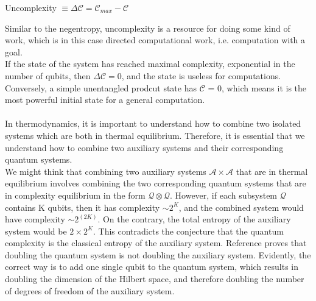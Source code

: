 \begin{center}
Uncomplexity $ \equiv \Delta \mathcal{C} = \mathcal{C}_{max} - \mathcal{C} $
\end{center}

Similar to the negentropy, uncomplexity is a resource for doing some kind of work, which is in this case directed computational work, i.e. computation with a goal.
\\
If the state of the system has reached maximal complexity, exponential in the number of qubits, then $ \Delta \mathcal{C} = 0 $, and the state is useless for computations. Conversely, a simple unentangled prodcut state has $\mathcal{C}$ = 0, which means it is the most powerful initial state for a general computation.
\\
\\
In thermodynamics, it is important to understand how to combine two isolated systems which are both in thermal equilibrium. Therefore, it is essential that we understand how to combine two auxiliary systems and their corresponding quantum systems.
\\
We might think that combining two auxiliary systems $\mathcal{A} \times \mathcal{A} $ that are in thermal equilibrium involves combining the two corresponding quantum systems that are in complexity equilibrium in the form $ \mathcal{Q} \otimes \mathcal{Q}$. However, if each subsystem $\mathcal{Q}$ contains K qubits, then it has complexity $ \sim 2^K $, and the combined system would have complexity $ \sim 2^{(2K)} $. On the contrary, the total entropy of the auxiliary system would be $ 2 \times 2^K $. This contradicts the conjecture that the quantum complexity is the classical entropy of the auxiliary system. Reference \cite{brown2018second} proves that doubling the quantum system is not doubling the auxiliary system. Evidently, the correct way is to add one single qubit to the quantum system, which results in doubling the dimension of the Hilbert space, and therefore doubling the number of degrees of freedom of the auxiliary system. 
\\

